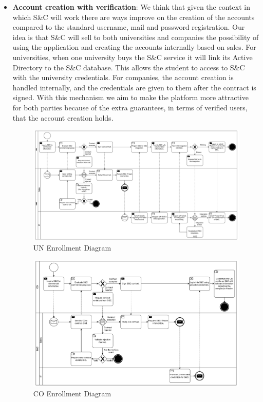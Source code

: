\begin{itemize}
      \item \textbf{Account creation with verification}:
            We think that given the context in which S\&C will work there are ways improve on the creation of the
            accounts compared to the standard username, mail and password registration. Our idea is that S\&C will sell
            to both universities and companies the possibility of using the application and creating the accounts
            internally based on sales. For universities, when one university buys the S\&C service it will link its
            Active Directory to the S\&C database. This allows the student to access to S\&C with the university
            credentials. For companies, the account creation is handled internally, and the credentials are given to
            them after the contract is signed. With this mechanism we aim to make the platform more attractive for both
            parties because of the extra guarantees, in terms of verified users, that the account creation holds.

            \begin{figure}[H]
                  \centering
                  \includegraphics[width=1.0\textwidth]{Images/BPMN_1C.pdf}
                  \caption{UN Enrollment Diagram}
                  \label{fig:un_enrollment_diagram}
            \end{figure}

            \begin{figure}[H]
                  \centering
                  \includegraphics[width=1.0\textwidth]{Images/BPMN_1B.pdf}
                  \caption{CO Enrollment Diagram}
                  \label{fig:co_enrollment_diagram}
            \end{figure}


\end{itemize}

